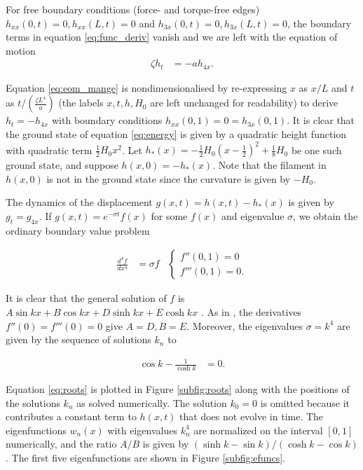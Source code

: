 For free boundary conditions (force- and torque-free edges) $h_{xx}(0, t) = 0, h_{xx}(L, t) = 0$ and $h_{3x}(0, t) = 0, h_{3x}(L, t) = 0$, the boundary terms in equation \ref{eq:func_deriv} vanish and we are left with the equation of motion 
\begin{align}
    \zeta h_t &= -a h_{4x}. \label{eq:eom_mange}
\end{align}

Equation \ref{eq:eom_mange} is nondimensionalised by re-expressing $x$ as $x/L$ and $t$ as $t / (\frac{\zeta L^4}{a})$ (the labels $x, t, h, H_0$ are left unchanged for readability) to derive $h_t = -h_{4x}$ with boundary conditions $h_{xx}(0, 1) = 0 = h_{3x}(0, 1)$. 
It is clear that the ground state of equation \ref{eq:energy} is given by a quadratic height function with quadratic term $\frac{1}{2}H_0x^2$. 
Let $h_*(x) = -\frac{1}{2} H_0(x-\frac{1}{2})^2 + \frac{1}{8}H_0$ be one such ground state, and suppose $h(x, 0) = -h_*(x)$. Note that the filament in $h(x, 0)$ is not in the ground state since the curvature is given by $-H_0$. 

The dynamics of the displacement $g(x, t) = h(x, t) - h_*(x)$ is given by $g_t = g_{4x}$. 
If $g(x, t) = e^{-\sigma t} f(x)$ for some $f(x)$ and eigenvalue $\sigma$, we obtain the ordinary boundary value problem 

\begin{align}
    \frac{d^4f}{dx^4} &= \sigma f & \begin{cases} f''(0, 1) = 0 \\ f'''(0, 1) = 0. \end{cases} \label{eq:bvp}
\end{align}

It is clear that the general solution of $f$ is $A \sin kx + B \cos kx + D \sinh kx + E \cosh kx$ \citep{landau1986}. 
As in \citet{wiggins1998}, the derivatives $f''(0) = f'''(0) = 0$ give $A = D, B = E$. 
Moreover, the eigenvalues $\sigma = k^4$ are given by the sequence of solutions $k_n$ to 

\begin{align}
    \cos k - \frac{1}{\cosh k} &= 0. \label{eq:roots}
\end{align}

Equation \ref{eq:roots} is plotted in Figure \ref{subfig:roots} along with the positions of the solutions $k_n$ as solved numerically. 
The solution $k_0 = 0$ is omitted because it contributes a constant term to $h(x, t)$ that does not evolve in time. 
The eigenfunctions $w_n(x)$ with eigenvalues $k_n^4$ are normalized on the interval $[0,1]$ numerically, and the ratio $A/B$ is given by $(\sinh k - \sin k) / (\cosh k - \cos k)$. 
The first five eigenfunctions are shown in Figure \ref{subfig:efuncs}. 

